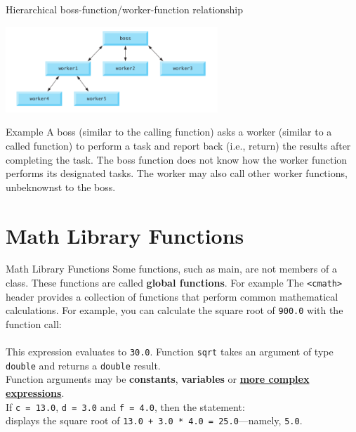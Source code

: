 \documentclass[10pt]{beamer}
\begin{document}
	
\begin{frame}{\normalsize Hierarchical boss-function/worker-function relationship}
	\begin{center}
		\includegraphics[width=8cm]{./.images/.img-6-3.png}
	\end{center}
\vspace{15pt}
\begin{exampleblock}{Example}
	\small\justifying
	A boss (similar to the calling function) asks a worker (similar to a called function) to
	perform a task and report back (i.e., return) the results after completing the task. The boss
	function does not know how the worker function performs its designated tasks. The
	worker may also call other worker functions, unbeknownst to the boss.
\end{exampleblock}	
\end{frame}




\section{Math Library Functions}
\begin{frame}{Math Library Functions}
	\justifying
	{\small Some functions, such as main, are not members of a class. These functions are called \textbf{global	functions}. For example The \texttt{\color{blue}<cmath>} header provides a collection of functions that perform common mathematical calculations. For example, you can calculate the square root of \texttt{900.0} with the	function call:}
\\
	
	\\
	{\small This expression evaluates to \texttt{30.0}. Function \texttt{sqrt} takes an argument of type \texttt{double} and returns a \texttt{double} result.\\\vspace{15pt}
	Function arguments may be \textbf{constants}, \textbf{variables} or \textbf{\underline{more complex expressions}}. \\If
	\texttt{c = 13.0}, \texttt{d = 3.0} and \texttt{f = 4.0}, then the statement:}
\\
	
	{\small displays the square root of \texttt{13.0 + 3.0 * 4.0 = 25.0}—namely, \texttt{5.0}.}
\end{frame}
\end{document}
